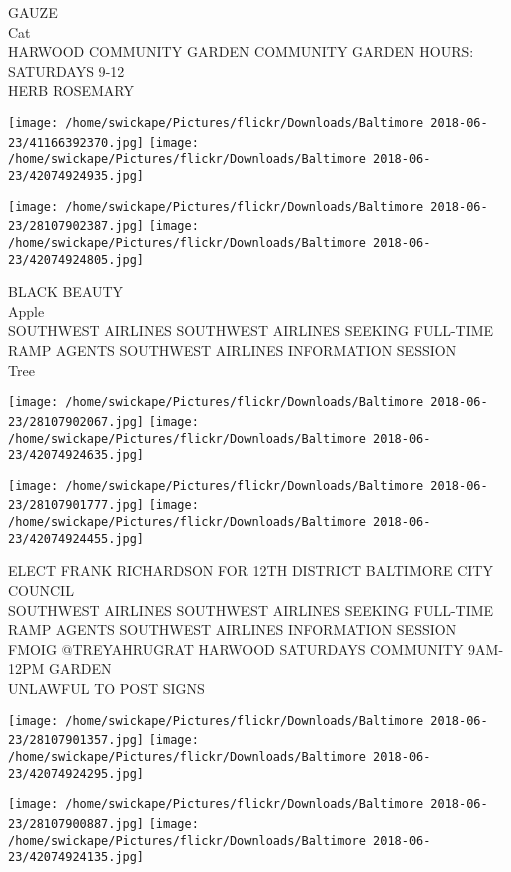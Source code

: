 \documentclass[10pt,letterpaper]{article}
\begin{document}
GAUZE\\
Cat\\
HARWOOD COMMUNITY GARDEN COMMUNITY GARDEN HOURS: SATURDAYS 9{-}12\\
HERB ROSEMARY
\pagebreak

\texttt{[image: /home/swickape/Pictures/flickr/Downloads/Baltimore 2018-06-23/41166392370.jpg]}
\texttt{[image: /home/swickape/Pictures/flickr/Downloads/Baltimore 2018-06-23/42074924935.jpg]}

\texttt{[image: /home/swickape/Pictures/flickr/Downloads/Baltimore 2018-06-23/28107902387.jpg]}
\texttt{[image: /home/swickape/Pictures/flickr/Downloads/Baltimore 2018-06-23/42074924805.jpg]}

BLACK BEAUTY\\
Apple\\
SOUTHWEST AIRLINES SOUTHWEST AIRLINES SEEKING FULL{-}TIME RAMP AGENTS SOUTHWEST AIRLINES INFORMATION SESSION\\
Tree
\pagebreak

\texttt{[image: /home/swickape/Pictures/flickr/Downloads/Baltimore 2018-06-23/28107902067.jpg]}
\texttt{[image: /home/swickape/Pictures/flickr/Downloads/Baltimore 2018-06-23/42074924635.jpg]}

\texttt{[image: /home/swickape/Pictures/flickr/Downloads/Baltimore 2018-06-23/28107901777.jpg]}
\texttt{[image: /home/swickape/Pictures/flickr/Downloads/Baltimore 2018-06-23/42074924455.jpg]}

ELECT FRANK RICHARDSON FOR 12TH DISTRICT BALTIMORE CITY COUNCIL\\
SOUTHWEST AIRLINES SOUTHWEST AIRLINES SEEKING FULL{-}TIME RAMP AGENTS SOUTHWEST AIRLINES INFORMATION SESSION\\
FMOIG @TREYAHRUGRAT HARWOOD SATURDAYS COMMUNITY 9AM{-}12PM GARDEN\\
UNLAWFUL TO POST SIGNS
\pagebreak

\texttt{[image: /home/swickape/Pictures/flickr/Downloads/Baltimore 2018-06-23/28107901357.jpg]}
\texttt{[image: /home/swickape/Pictures/flickr/Downloads/Baltimore 2018-06-23/42074924295.jpg]}

\texttt{[image: /home/swickape/Pictures/flickr/Downloads/Baltimore 2018-06-23/28107900887.jpg]}
\texttt{[image: /home/swickape/Pictures/flickr/Downloads/Baltimore 2018-06-23/42074924135.jpg]}
\end{document}
